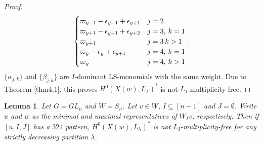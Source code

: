 \documentclass[12pt]{amsart}
\newtheorem{lemma}[theorem]{Lemma}
\theoremstyle{definition}
\theoremstyle{remark}
\newcommand{\hsp}{\hspace{0.2em}}
\begin{document}
\begin{proof}
\begin{subequations}
\begin{equation}
\begin{cases}
\varpi_{y-1}-\epsilon_{y-1}+\epsilon_{y+1} & j=2 \\
\varpi_{y+1}-\epsilon_{y+1}+\epsilon_{y+2} & j=3 , \hsp k=1 \\
\varpi_{y+1} & j=3 \hsp k>1 \\
\varpi_{y}-\epsilon_{y}+\epsilon_{y+1} & j=4 , \hsp k=1 \\
\varpi_y & j=4 , \hsp k>1
\end{cases}
.
\end{equation}
\end{subequations}
$\{\alpha_{j,k}\}$ and $\{\beta_{j,k}\}$ are $I$-dominant LS-monomials with the same weight. Due to Theorem \ref{thm4.1}, this proves $H^0(X(w) , L_\lambda)^*$ is not $L_I$-multiplicity-free.
\end{proof}

\begin{lemma}\label{lem4.8}
Let $G= GL_n$ and $W= S_n$. Let $v \in W$, $I \subseteq [n-1]$ and $J=\emptyset$. Write $u$ and $w$ as the minimal and maximal representatives of $W_I v$, respectively. Then if $[u,I,J]$ has a $321$ pattern, $H^0(X(w),L_\lambda)^*$ is not $L_I$-multiplicity-free for any strictly decreasing partition $\lambda$.
\end{lemma}
\end{document}
